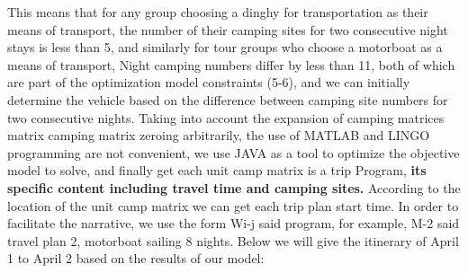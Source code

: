 	\par This means that for any group choosing a dinghy for transportation as their means of transport, the number of their camping sites for two consecutive night stays is less than 5, and similarly for tour groups who choose a motorboat as a means of transport, Night camping numbers differ by less than 11, both of which are part of the optimization model constraints (5-6), and we can initially determine the vehicle based on the difference between camping site numbers for two consecutive nights. Taking into account the expansion of camping matrices matrix camping matrix zeroing arbitrarily, the use of MATLAB and LINGO programming are not convenient, we use JAVA as a tool to optimize the objective model to solve, and finally get each unit camp matrix is a trip Program, \textbf{its specific content including travel time and camping sites.} According to the location of the unit camp matrix we can get each trip plan start time. In order to facilitate the narrative, we use the form Wi-j said program, for example, M-2 said travel plan 2, motorboat sailing 8 nights. Below we will give the itinerary of April 1 to April 2 based on the results of our model:
	










